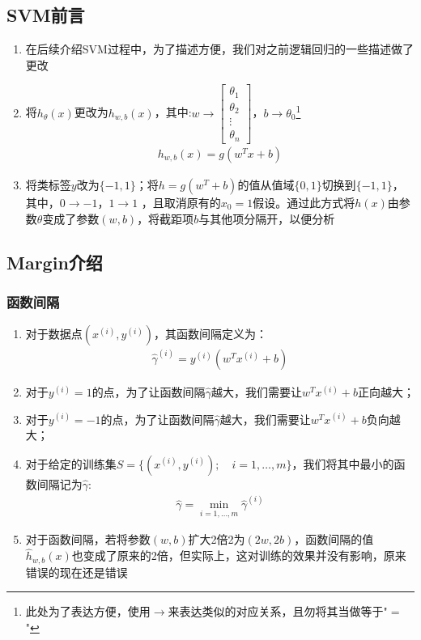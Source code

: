 \subsection{SVM前言}
\begin{enumerate}
	\item 在后续介绍SVM过程中，为了描述方便，我们对之前逻辑回归的一些描述做了更改
	\item 将$h_\theta(x)$更改为$h_{w,b}(x)$，其中:$w \to \left[\begin{matrix}\theta_1 \\ \theta_2 \\ \vdots \\ \theta_n  \end{matrix}\right]$，$b \to \theta_0$\footnote{此处为了表达方便，使用$\to$来表达类似的对应关系，且勿将其当做等于"$=$"}
	\begin{align}
		h_{w,b}(x) = g(w^Tx+b)
	\end{align}
	\item 将类标签$y$改为$\{-1, 1\}$；将$h=g(w^T+b)$的值从值域$\{0,1\}$切换到$\{-1, 1\}$，其中，$0\to -1$，$1\to 1$
	，且取消原有的$x_0=1$假设。通过此方式将$h(x)$由参数$\theta$变成了参数$(w, b)$，将截距项$b$与其他项分隔开，以便分析
\end{enumerate}

\subsection{Margin介绍}
\subsubsection{函数间隔}
\begin{enumerate}
	\item 对于数据点$(x^{(i)}, y^{(i)})$，其函数间隔定义为：
	\begin{align}
		\hat{\gamma}^{(i)} = y^{(i)}(w^Tx^{(i)} + b)
	\end{align}
	\item 对于$y^{(i)}=1$的点，为了让函数间隔$\hat{\gamma}$越大，我们需要让$w^Tx^{(i)} + b$正向越大；
	\item 对于$y^{(i)}=-1$的点，为了让函数间隔$\hat{\gamma}$越大，我们需要让$w^Tx^{(i)} + b$负向越大；
	\item 对于给定的训练集$S=\{(x^{(i)}, y^{(i)}); \quad i = 1, \dots, m\}$，我们将其中最小的函数间隔记为$\hat{\gamma}$:
	\begin{align}
		\hat{\gamma} = \min_{i=1,\dots,m}\hat{\gamma}^{(i)}
	\end{align}
	\item 对于函数间隔，若将参数$(w,b)$扩大2倍2为$(2w,2b)$，函数间隔的值$\hat{h}_{w,b}(x)$也变成了原来的2倍，但实际上，这对训练的效果并没有影响，原来错误的现在还是错误
\end{enumerate}

